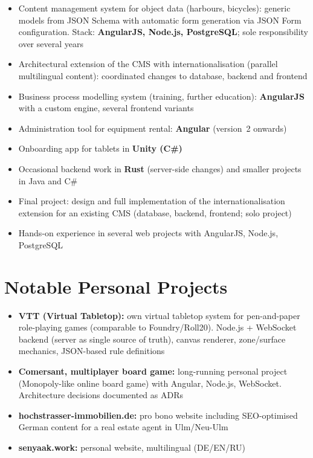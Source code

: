 \begin{itemize}
  \item Content management system for object data (harbours, bicycles): generic models from JSON Schema with automatic form generation via JSON Form configuration. Stack: \textbf{AngularJS, Node.js, PostgreSQL}; sole responsibility over several years
  \item Architectural extension of the CMS with internationalisation (parallel multilingual content): coordinated changes to database, backend and frontend
  \item Business process modelling system (training, further education): \textbf{AngularJS} with a custom engine, several frontend variants
  \item Administration tool for equipment rental: \textbf{Angular} (version~2 onwards)
  \item Onboarding app for tablets in \textbf{Unity (C\#)}
  \item Occasional backend work in \textbf{Rust} (server-side changes) and smaller projects in Java and C\#
\end{itemize}

\begin{itemize}
  \item Final project: design and full implementation of the internationalisation extension for an existing CMS (database, backend, frontend; solo project)
  \item Hands-on experience in several web projects with AngularJS, Node.js, PostgreSQL
\end{itemize}

\section*{Notable Personal Projects}

\begin{itemize}
  \item \textbf{VTT (Virtual Tabletop):} own virtual tabletop system for pen-and-paper role-playing games (comparable to Foundry/Roll20). Node.js + WebSocket backend (server as single source of truth), canvas renderer, zone/surface mechanics, JSON-based rule definitions
  \item \textbf{Comersant, multiplayer board game:} long-running personal project (Monopoly-like online board game) with Angular, Node.js, WebSocket. Architecture decisions documented as ADRs
  \item \textbf{hochstrasser-immobilien.de:} pro bono website including SEO-optimised German content for a real estate agent in Ulm/Neu-Ulm
  \item \textbf{senyaak.work:} personal website, multilingual (DE/EN/RU)
\end{itemize}

